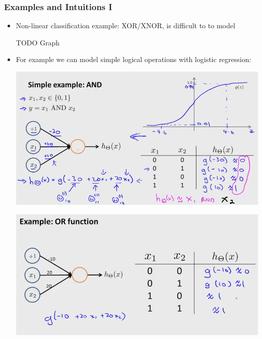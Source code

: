 \subsubsection{Examples and Intuitions I}
\begin{itemize}[--]
	\item Non-linear classification example: XOR/XNOR, is difficult to to model

	TODO Graph

	\item For example we can model simple logical operations with logistic regression:
	\begin{center}
		\includegraphics[scale=0.5]{sections/cs229/w5/and_nn.png}
	\end{center}

	\begin{center}
		\includegraphics[scale=0.5]{sections/cs229/w5/or_nn.png}
	\end{center}
\end{itemize}

